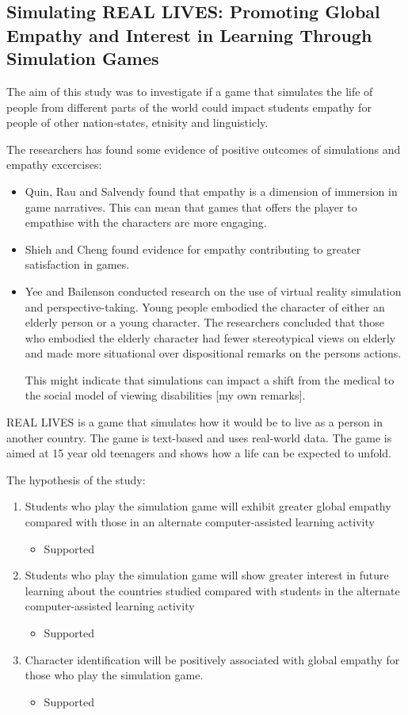 \subsection{Simulating REAL LIVES: Promoting Global Empathy and Interest in Learning Through Simulation Games}
The aim of this study was to investigate if a game that simulates the life of people from different parts of the world could impact students empathy for people of other nation-states, etnisity and linguisticly.

The researchers has found some evidence of positive outcomes of simulations and empathy excercises:
\begin{itemize}
    \item Quin, Rau and Salvendy found that empathy is a dimension of immersion in game narratives. This can mean that games that offers the player to empathise with the characters are more engaging.
    \item Shieh and Cheng found evidence for empathy contributing to greater satisfaction in games.
    \item Yee and Bailenson conducted research on the use of virtual reality simulation and perspective-taking. Young people embodied the character of either an elderly person or a young character. The researchers concluded that those who embodied the elderly character had fewer stereotypical views on elderly and made more situational over dispositional remarks on the persons actions. 
    
    This might indicate that simulations can impact a shift from the medical to the social model of viewing disabilities [my own remarks].
\end{itemize}

REAL LIVES is a game that simulates how it would be to live as a person in another country. The game is text-based and uses real-world data. The game is aimed at 15 year old teenagers and shows how a life can be expected to unfold. 

The hypothesis of the study:
\begin{enumerate}
    \item Students who play the simulation game will exhibit greater global empathy compared with those in an alternate computer-assisted learning activity
    \begin{itemize}
        \item Supported
    \end{itemize}
    \item Students who play the simulation game will show greater interest in future learning about the countries studied compared with students in the alternate computer-assisted learning activity
    \begin{itemize}
        \item Supported
    \end{itemize}
    \item Character identification will be positively associated with global empathy for those who play the simulation game.
    \begin{itemize}
        \item Supported
    \end{itemize}
\end{enumerate}


